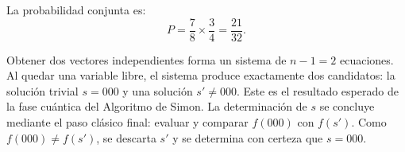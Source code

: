 La probabilidad conjunta es:
$$
    \boxed{P = \frac{7}{8} \times \frac{3}{4} = \frac{21}{32}.}
$$

Obtener dos vectores independientes forma un sistema de $n-1 = 2$ ecuaciones. Al quedar una variable libre, el sistema produce exactamente dos candidatos: la solución trivial $s = 000$ y una solución $s' \neq 000$. Este es el resultado esperado de la fase cuántica del Algoritmo de Simon. La determinación de $s$ se concluye mediante el paso clásico final: evaluar y comparar $f(000)$ con $f(s')$. Como $f(000) \neq f(s')$, se descarta $s'$ y se determina con certeza que $s = 000$.